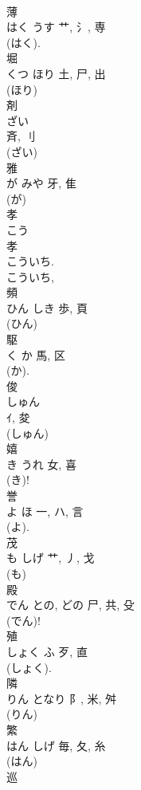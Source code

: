 \documentclass[8pt]{extreport}
\begin{document}
\begin{CJK}{UTF8}{min}
\\	薄	
\\	はく	うす	艹, 氵, 専	
\\	(はく). 
\\	堀	
\\	くつ	ほり	土, 尸, 出	
\\	(ほり) 
\\	剤	
\\	ざい	
\\	斉, 刂	
\\	(ざい) 
\\	雅	
\\	が	みや	牙, 隹	
\\	(が) 
\\	孝	
\\	こう	
\\	孝	
\\	こういち.	
\\	こういち, 
\\	頻	
\\	ひん	しき	歩, 頁	
\\	(ひん) 
\\	駆	
\\	く	か	馬, 区	
\\	(か). 
\\	俊	
\\	しゅん	
\\	ｲ, 夋	
\\	(しゅん) 
\\	嬉	
\\	き	うれ	女, 喜	
\\	(き)!
\\	誉	
\\	よ	ほ	一, ハ, 言		
\\	(よ). 
\\	茂	
\\	も	しげ	艹, 丿, 戈	
\\	(も) 
\\	殿	
\\	でん	との, どの	尸, 共, 殳	
\\	(でん)!
\\	殖	
\\	しょく	ふ	歹, 直	
\\	(しょく). 
\\	隣	
\\	りん	となり	阝, 米, 舛	
\\	(りん) 
\\	繁	
\\	はん	しげ	毎, 夂, 糸	
\\	(はん) 
\\	巡	

\end{CJK}
\end{document}
